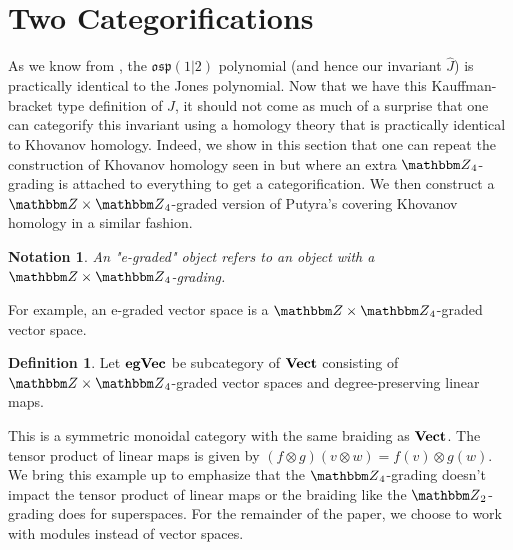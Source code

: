 \documentclass{amsart}
\theoremstyle{plain}
\newtheorem{notation}[theorem]{Notation}
\theoremstyle{definition}
\newtheorem{definition}[theorem]{Definition}
\theoremstyle{definition}
\numberwithin{equation}{section}
\numberwithin{theorem}{section}
\newcommand{\cat}[1]{\ensuremath{\mbox{\bfseries {\upshape {#1}}}}}
\def\mf{\mathfrak}
\numberwithin{equation}{section}
\let\hat=\widehat
\def\Z{{\mathbbm Z}}
\begin{document}
\section{Two Categorifications}\label{section:cat}
As we know from \cite{C,Blu09}, the $\mf{osp}(1|2)$ polynomial (and hence our invariant $\hat{J}$) is practically identical to the Jones polynomial.
Now that we have this Kauffman-bracket type definition of $\hat{J}$, it should not come as much of a surprise that one can categorify this invariant using a homology theory that is practically identical to Khovanov homology.
Indeed, we show in this section that one can repeat the construction of Khovanov homology seen in \cite{BN2} but where an extra $\Z_4$-grading is attached to everything to get a categorification.
We then construct a $\Z\times \Z_4$-graded version of Putyra's covering Khovanov homology \cite{P} in a similar fashion.



\begin{notation}
  An "e-graded" object refers to an object with a $\Z\times \Z_4$-grading.
\end{notation}
For example, an e-graded vector space is a $\Z\times \Z_4$-graded vector space.
\begin{definition}
  Let $\cat{egVec}$ be subcategory of $\cat{Vect}$ consisting of $\Z\times \Z_4$-graded vector spaces and degree-preserving linear maps.
\end{definition}
This is a symmetric monoidal category with the same braiding as $\cat{Vect}$.
The tensor product of linear maps is given by $(f\otimes g)(v\otimes w)=f(v)\otimes g(w)$.
We bring this example up to emphasize that the $\Z_4$-grading doesn't impact the tensor product of linear maps or the braiding like the $\Z_2$-grading does for superspaces.
For the remainder of the paper, we choose to work with modules instead of vector spaces.
%
\end{document}
